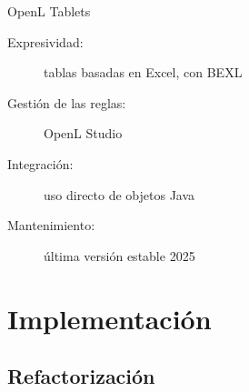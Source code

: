 \documentclass[10pt]{beamer}
\begin{document}
\begin{frame}{OpenL Tablets}
    \begin{description}
        \item [Expresividad:] tablas basadas en Excel, con BEXL
        \item [Gestión de las reglas:] OpenL Studio
        \item [Integración:] uso directo de objetos Java
        \item [Mantenimiento:] última versión estable 2025
    \end{description}
\end{frame}

\section{Implementación}

\subsection{Refactorización}
\end{document}
